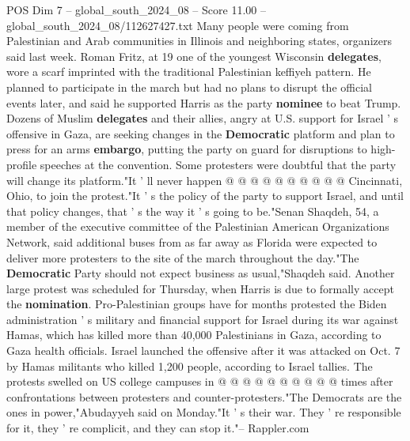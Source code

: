 \begin{textsample}{POS Dim 7 – global\_south\_2024\_08 – Score 11.00 – global\_south\_2024\_08/112627427.txt}
Many people were coming from Palestinian and Arab communities in Illinois and neighboring states, organizers said last week.
Roman Fritz, at 19 one of the youngest Wisconsin \textbf{delegates}, wore a scarf imprinted with the traditional Palestinian keffiyeh pattern.
He planned to participate in the march but had no plans to disrupt the official events later, and said he supported Harris as the party \textbf{nominee} to beat Trump.
Dozens of Muslim \textbf{delegates} and their allies, angry at U.S. support for Israel ' s offensive in Gaza, are seeking changes in the \textbf{Democratic} platform and plan to press for an arms \textbf{embargo}, putting the party on guard for disruptions to high-profile speeches at the convention.
Some protesters were doubtful that the party will change its platform."It ' ll never happen @ @ @ @ @ @ @ @ @ @ Cincinnati, Ohio, to join the protest."It ' s the policy of the party to support Israel, and until that policy changes, that ' s the way it ' s going to be."Senan Shaqdeh, 54, a member of the executive committee of the Palestinian American Organizations Network, said additional buses from as far away as Florida were expected to deliver more protesters to the site of the march throughout the day."The \textbf{Democratic} Party should not expect business as usual,"Shaqdeh said.
Another large protest was scheduled for Thursday, when Harris is due to formally accept the \textbf{nomination}.
Pro-Palestinian groups have for months protested the Biden administration ' s military and financial support for Israel during its war against Hamas, which has killed more than 40,000 Palestinians in Gaza, according to Gaza health officials.
Israel launched the offensive after it was attacked on Oct. 7 by Hamas militants who killed 1,200 people, according to Israel tallies.
The protests swelled on US college campuses in @ @ @ @ @ @ @ @ @ @ times after confrontations between protesters and counter-protesters."The Democrats are the ones in power,"Abudayyeh said on Monday."It ' s their war.
They ' re responsible for it, they ' re complicit, and they can stop it."-- Rappler.com

\end{textsample}
